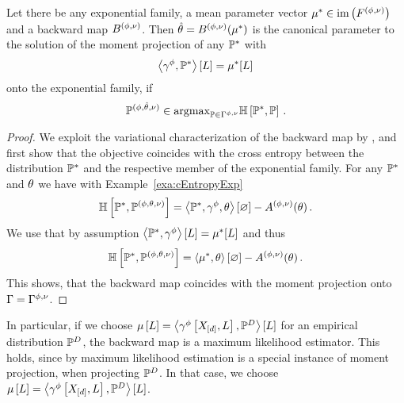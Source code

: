 \begin{theorem}
    Let there be any exponential family, a mean parameter vector $\mu^*\in\mathrm{im}\left(F^{(\phi,\nu)}\right)$ and a backward map $B^{(\phi,\nu)}$.
    Then $\hat{\theta}=B^{(\phi,\nu)}(\mu^*)$ is the canonical parameter to the solution of the moment projection  of any $\mathbb{P}^*$ with
    \begin{align*}
        \left\langle \gamma^{\phi},\mathbb{P}^*\right\rangle \left[ L \right]=\mu^*[L]
    \end{align*}
    onto the exponential family, if
    \[ \mathbb{P}^{(\phi,\hat{\theta},\nu)} \in \mathrm{argmax}_{\mathbb{P}\in\Gamma^{\phi,\nu}} \mathbb{H}\left[\mathbb{P}^*,\mathbb{P}\right]  \, . \]

\end{theorem}
\begin{proof}
    We exploit the variational characterization of the backward map by , and first show that the objective coincides with the cross entropy between the distribution $\mathbb{P}^*$ and the respective member of the exponential family.
    For any $\mathbb{P}^*$ and $\theta$ we have with Example~\ref{exa:cEntropyExp}
    \begin{align*}
        \mathbb{H}\left[\mathbb{P}^*,\mathbb{P}^{(\phi,\theta,\nu)}\right]
        = \left\langle \mathbb{P}^*,\gamma^{\phi},\theta\right\rangle \left[ \varnothing \right] -A^{(\phi,\nu)}(\theta) \, .
    \end{align*}
    We use that by assumption $\left\langle \mathbb{P}^*,\gamma^{\phi}\right\rangle \left[ L \right]=\mu^*[L]$ and thus
    \begin{align*}
        \mathbb{H}\left[\mathbb{P}^*,\mathbb{P}^{(\phi,\theta,\nu)}\right]
        =   \left\langle \mu^*,\theta\right\rangle \left[ \varnothing \right] -A^{(\phi,\nu)}(\theta) \, .
    \end{align*}
    This shows, that the backward map coincides with the moment projection onto $\Gamma=\Gamma^{\phi,\nu}$.
\end{proof}

In particular, if we choose $\mu\left[L\right]=\left\langle \gamma^{\phi}\left[X_{[d]},L\right],\mathbb{P}^{D}\right\rangle \left[ L \right]$ for an empirical distribution $\mathbb{P}^{D}$, the backward map is a maximum likelihood estimator.
This holds, since by  maximum likelihood estimation is a special instance of moment projection, when projecting $\mathbb{P}^{D}$.
In that case, we choose $\mu\left[L\right]=\left\langle \gamma^{\phi}\left[X_{[d]},L\right],\mathbb{P}^{D}\right\rangle \left[ L \right]$.


